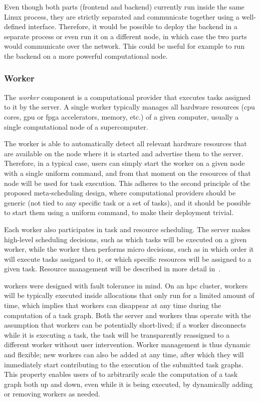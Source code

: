 Even though both parts (frontend and backend) currently run inside the same Linux process, they are
strictly separated and communicate together using a well-defined interface. Therefore, it would be
possible to deploy the backend in a separate process or even run it on a different node, in which
case the two parts would communicate over the network. This could be useful for example to run the
backend on a more powerful computational node.

\subsubsection*{Worker}
The \emph{worker} component is a computational provider that executes tasks assigned to
it by the server. A single worker typically manages all hardware resources (\gls{cpu}
cores, \gls{gpu} or \gls{fpga} accelerators, memory, etc.) of a given
computer, usually a single computational node of a supercomputer.

The worker is able to automatically detect all relevant hardware resources that are available on
the node where it is started and advertise them to the server. Therefore, in a typical case, users
can simply start the worker on a given node with a single uniform command, and from that moment on
the resources of that node will be used for task execution. This adheres to the second principle of
the proposed meta-scheduling design, where computational providers should be generic (not tied to
any specific task or a set of tasks), and it should be possible to start them using a uniform
command, to make their deployment trivial.

Each worker also participates in task and resource scheduling. The server makes high-level
scheduling decisions, such as which tasks will be executed on a given worker, while the worker then
performs micro decisions, such as in which order it will execute tasks assigned to it, or which
specific resources will be assigned to a given task. Resource management will be described in more
detail in~.

\hyperqueue{} workers were designed with fault tolerance in mind. On an
\gls{hpc}
cluster, workers will be typically executed inside allocations that only run for a limited amount
of time, which implies that workers can disappear at any time during the computation of a task
graph. Both the server and workers thus operate with the assumption that workers can be potentially
short-lived; if a worker disconnects while it is executing a task, the task will be transparently
reassigned to a different worker without user intervention. Worker management is thus dynamic and
flexible; new workers can also be added at any time, after which they will immediately start
contributing to the execution of the submitted task graphs. This property enables users of
\hq{} to arbitrarily scale the computation of a task graph both up and down, even
while it is being executed, by dynamically adding or removing workers as needed.

